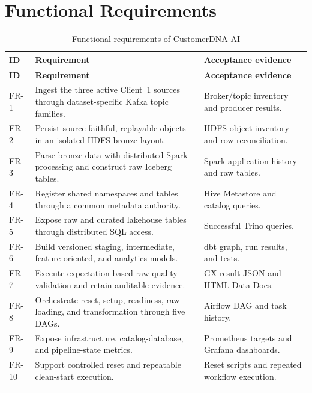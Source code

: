 \section{Functional Requirements}
\begin{longtable}{|>{\raggedright\arraybackslash}p{}|>{\raggedright\arraybackslash}p{}|>{\raggedright\arraybackslash}p{}|}
    \hline
    \rowcolor{ModernTableHeader}
    \color{white}\textbf{ID} & \color{white}\textbf{Requirement} & \color{white}\textbf{Acceptance evidence} \\
    \hline
    \endfirsthead
    \hline
    \rowcolor{ModernTableHeader}
    \color{white}\textbf{ID} & \color{white}\textbf{Requirement} & \color{white}\textbf{Acceptance evidence} \\
    \hline
    \endhead
    FR-1 & Ingest the three active Client~1 sources through dataset-specific Kafka topic families. & Broker/topic inventory and producer results. \\
    \hline
    FR-2 & Persist source-faithful, replayable objects in an isolated HDFS bronze layout. & HDFS object inventory and row reconciliation. \\
    \hline
    FR-3 & Parse bronze data with distributed Spark processing and construct raw Iceberg tables. & Spark application history and raw tables. \\
    \hline
    FR-4 & Register shared namespaces and tables through a common metadata authority. & Hive Metastore and catalog queries. \\
    \hline
    FR-5 & Expose raw and curated lakehouse tables through distributed SQL access. & Successful Trino queries. \\
    \hline
    FR-6 & Build versioned staging, intermediate, feature-oriented, and analytics models. & dbt graph, run results, and tests. \\
    \hline
    FR-7 & Execute expectation-based raw quality validation and retain auditable evidence. & GX result JSON and HTML Data Docs. \\
    \hline
    FR-8 & Orchestrate reset, setup, readiness, raw loading, and transformation through five DAGs. & Airflow DAG and task history. \\
    \hline
    FR-9 & Expose infrastructure, catalog-database, and pipeline-state metrics. & Prometheus targets and Grafana dashboards. \\
    \hline
    FR-10 & Support controlled reset and repeatable clean-start execution. & Reset scripts and repeated workflow execution. \\
    \hline
    \caption{Functional requirements of CustomerDNA AI}
    \label{tab:refactor-functional-requirements}
\end{longtable}

